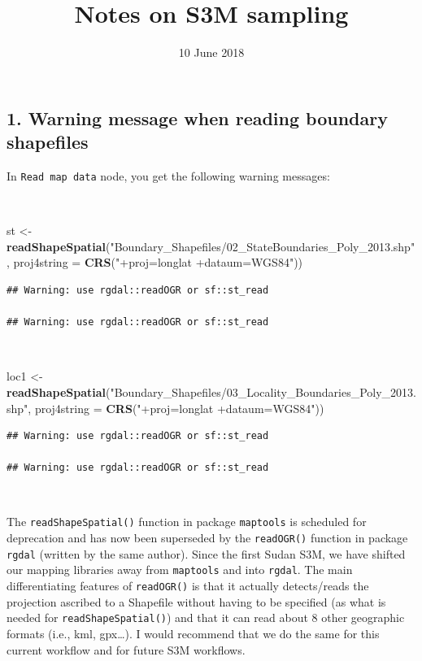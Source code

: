 \documentclass[11pt,a4paper]{article}
\title{Notes on S3M sampling}
\author{}
\date{10 June 2018}
\newenvironment{Shaded}{}{}
\newcommand{\KeywordTok}[1]{\textcolor[rgb]{0.00,0.44,0.13}{\textbf{#1}}}
\newcommand{\DataTypeTok}[1]{\textcolor[rgb]{0.56,0.13,0.00}{#1}}
\newcommand{\StringTok}[1]{\textcolor[rgb]{0.25,0.44,0.63}{#1}}
\newcommand{\NormalTok}[1]{#1}
\begin{document}
\maketitle

\hypertarget{warning-message-when-reading-boundary-shapefiles}{%
\subsection{1. Warning message when reading boundary
shapefiles}\label{warning-message-when-reading-boundary-shapefiles}}

In \texttt{Read\ map\ data} node, you get the following warning
messages:

~

\begin{Shaded}
\begin{Highlighting}[]
\NormalTok{st <-}\StringTok{ }\KeywordTok{readShapeSpatial}\NormalTok{(}\StringTok{"Boundary_Shapefiles/02_StateBoundaries_Poly_2013.shp"}\NormalTok{, }
                       \DataTypeTok{proj4string =} \KeywordTok{CRS}\NormalTok{(}\StringTok{"+proj=longlat +dataum=WGS84"}\NormalTok{))}
\end{Highlighting}
\end{Shaded}

\begin{verbatim}
## Warning: use rgdal::readOGR or sf::st_read

## Warning: use rgdal::readOGR or sf::st_read
\end{verbatim}

~

\begin{Shaded}
\begin{Highlighting}[]
\NormalTok{loc1 <-}\StringTok{ }\KeywordTok{readShapeSpatial}\NormalTok{(}\StringTok{"Boundary_Shapefiles/03_Locality_Boundaries_Poly_2013.shp"}\NormalTok{, }
                         \DataTypeTok{proj4string =} \KeywordTok{CRS}\NormalTok{(}\StringTok{"+proj=longlat +dataum=WGS84"}\NormalTok{))}
\end{Highlighting}
\end{Shaded}

\begin{verbatim}
## Warning: use rgdal::readOGR or sf::st_read

## Warning: use rgdal::readOGR or sf::st_read
\end{verbatim}

~

The \texttt{readShapeSpatial()} function in package \texttt{maptools} is
scheduled for deprecation and has now been superseded by the
\texttt{readOGR()} function in package \texttt{rgdal} (written by the
same author). Since the first Sudan S3M, we have shifted our mapping
libraries away from \texttt{maptools} and into \texttt{rgdal}. The main
differentiating features of \texttt{readOGR()} is that it actually
detects/reads the projection ascribed to a Shapefile without having to
be specified (as what is needed for \texttt{readShapeSpatial()}) and
that it can read about 8 other geographic formats (i.e., kml,
gpx\ldots{}). I would recommend that we do the same for this current
workflow and for future S3M workflows.
\end{document}
